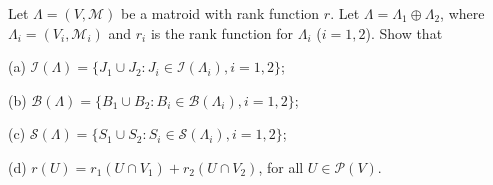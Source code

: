 Let $\Lambda = (V, \mathcal{M})$ be a matroid with rank function $r$. Let $\Lambda = \Lambda_1 \oplus \Lambda_2$, where $\Lambda_i = (V_i, \mathcal{M}_i)$ and $r_i$ is the rank function for $\Lambda_i$ ($i = 1, 2$). Show that

(a) $\mathcal{I}(\Lambda) = \{J_1 \cup J_2: J_i \in \mathcal{I}(\Lambda_i), i = 1, 2\}$;

(b) $\mathcal{B}(\Lambda) = \{B_1 \cup B_2: B_i \in \mathcal{B}(\Lambda_i), i = 1, 2\}$;

(c) $\mathcal{S}(\Lambda) = \{S_1 \cup S_2: S_i \in \mathcal{S}(\Lambda_i), i = 1, 2\}$;

(d) $r(U) = r_1(U \cap V_1) + r_2(U \cap V_2)$, for all $U \in \mathcal{P}(V)$.

